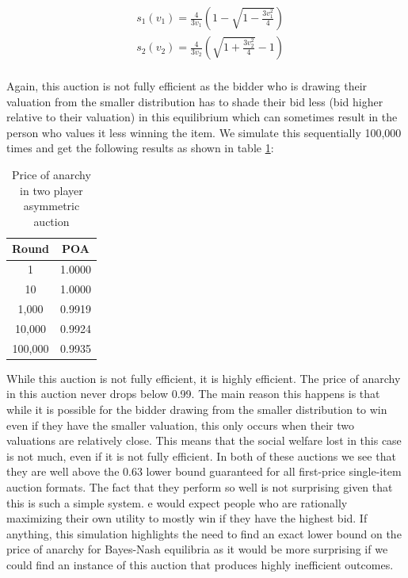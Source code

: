 \documentclass[12pt,twoside]{reedthesis}
\begin{document}
\begin{align*}
&s_1(v_1) = \frac{4}{3 v_1} \left(1 - \sqrt{1 - \frac{3v_1^2}{4}}\right)\\
&s_2(v_2) = \frac{4}{3 v_2} \left(\sqrt{1 + \frac{3v_2^2}{4}} - 1 \right)\\
\end{align*}

Again, this auction is not fully efficient as the bidder who is drawing their valuation from the smaller distribution has to shade their bid less (bid higher relative to their valuation) in this equilibrium which can sometimes result in the person who values it less winning the item. We simulate this sequentially 100,000 times and get the following results as shown in table \ref{table:2}:
\begin{table}[h!]
	\begin{center}
		\begin{tabular}{ |c|c| }
			\hline
			Round & POA \\
			\hline
			1 & 1.0000 \\
			10 & 1.0000 \\
			1,000 & 0.9919 \\
			10,000 & 0.9924 \\
			100,000 & 0.9935 \\
			\hline
		\end{tabular}
		\caption{Price of anarchy in two player asymmetric auction}
		\label{table:2}
	\end{center} 
\end{table}

While this auction is not fully efficient, it is highly efficient. The price of anarchy in this auction never drops below 0.99. The main reason this happens is that while it is possible for the bidder drawing from the smaller distribution to win even if they have the smaller valuation, this only occurs when their two valuations are relatively close. This means that the social welfare lost in this case is not much, even if it is not fully efficient. In both of these auctions we see that they are well above the $0.63$ lower bound guaranteed for all first-price single-item auction formats. The fact that they perform so well is not surprising given that this is such a simple system. e would expect people who are rationally maximizing their own utility to mostly win if they have the highest bid. If anything, this simulation highlights the need to find an exact lower bound on the price of anarchy for Bayes-Nash equilibria as it would be more surprising if we could find an instance of this auction that produces highly inefficient outcomes.
\end{document}
